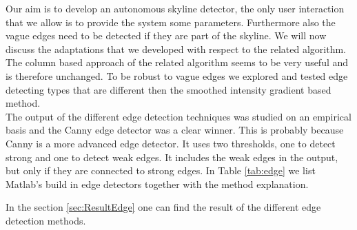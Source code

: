 Our aim is to develop an autonomous skyline detector, the only user interaction
that we allow is to provide the system some parameters. Furthermore also the vague
edges need to be detected if they are part of the skyline. We will now discuss
the adaptations that we developed with respect to the related algorithm.\\

The column based approach of the related algorithm seems to be very useful and is
therefore unchanged.  To be robust to vague edges we explored and tested
edge detecting types that are different then the smoothed intensity gradient
based method.\\

The output of the different edge detection techniques was studied on an empirical
basis and the Canny edge detector \cite{Canny} was a clear winner. This is
probably because Canny is a more advanced edge detector.  It uses two
thresholds, one to detect strong and one to detect weak edges. It includes the weak edges in the
output, but only if they are connected to strong edges. In Table \ref{tab:edge} %
we list Matlab's build in edge detectors together with the method explanation.

In the section \ref{sec:ResultEdge} one can find the result of the different
edge detection methods.


